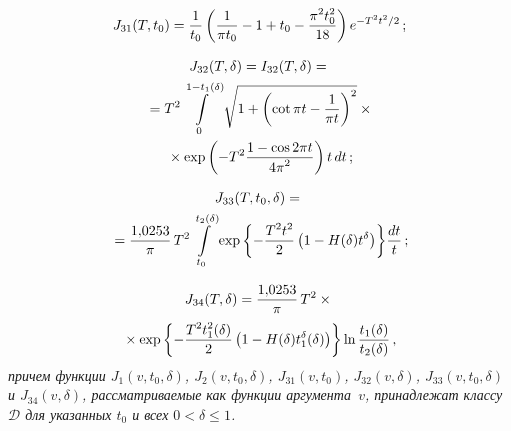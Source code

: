\begin{multicols}{2}
\vspace*{-12pt}

\noindent
$$
J_{31}(T,t_0)=\fr{1}{t_0}\left(\fr{1}{\pi
t_0}-1+t_0-\fr{\pi^2t_0^2}{18}\right)e^{-T^2t^2/2}\,;
$$

\vspace*{-12pt}

\noindent
\begin{multline*}
J_{32}(T,\delta)=  I_{32}(T,\delta)= {}\\
{}=
 T^2\int\limits_0^{1-t_1(\delta)}
\sqrt{1+\left(\cot \pi t-\fr{1}{\pi t}\right)^2}\times{}\\
{}\times
\exp\left(-T^2\fr{1-\cos 2\pi t}{4\pi^2}\right)t\,dt\,;
\end{multline*}

\vspace*{-12pt}

\noindent
\begin{multline*}
J_{33}(T,t_0,\delta)={}\\
{}= \fr{1{,}0253}{\pi}\,T^2\int\limits_{t_0}^{t_2(\delta)}
{\exp\left\{-\fr{T^2t^2}2\left(1-H(\delta)t^{\delta}\right)\right\}}
\fr{dt}{t}\,;
\end{multline*}

\vspace*{-12pt}

\noindent
\begin{multline*}
J_{34}(T,\delta)= \fr{1{,}0253}{\pi}\,T^2\times{}\\
{}\times
\exp\left\{-\fr{T^2t_1^2(\delta)}2\left(1-H(\delta)t_1^{\delta}(\delta)\right)
\right\} \ln\fr{t_1(\delta)}{t_2(\delta)}\,,
\end{multline*}
\textit{причем функции $J_1(v,t_0,\delta)$,
$J_2(v,t_0,\delta)$, $J_{31}(v,t_0)$,
$J_{32}(v,\delta)$, $J_{33}(v,t_0,\delta)$ и
$J_{34}(v,\delta)$, рассматриваемые
как функции аргумента~$v$, принадлежат классу~$\mathcal D$ для
указанных $t_0$ и всех ${0<\delta\le 1}$.}

\setcounter{table}{6}
\begin{table*}[b]\small %
\begin{center}
\vspace*{2ex}


\end{center}
\end{table*}
\end{multicols}
